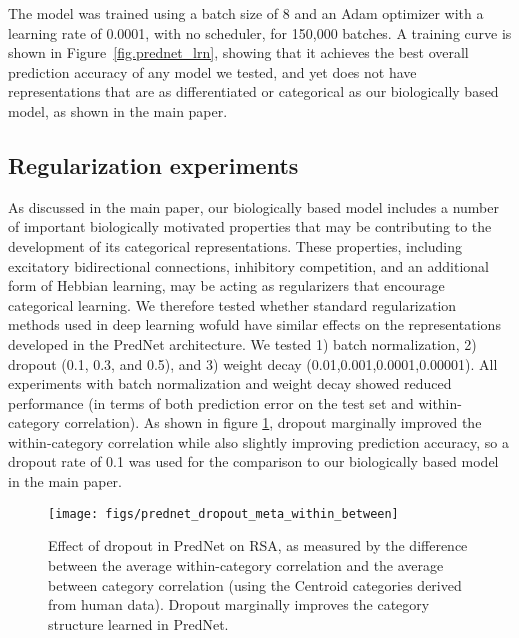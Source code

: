 \documentclass[12pt,twoside]{article}
\newif\myifpdf
\begin{document}
The model was trained using a batch size of 8 and an Adam optimizer with a learning rate of 0.0001, with no scheduler, for 150,000 batches.  A training curve is shown in Figure~\ref{fig.prednet_lrn}, showing that it achieves the best overall prediction accuracy of any model we tested, and yet does not have representations that are as differentiated or categorical as our biologically based model, as shown in the main paper.

\subsection{Regularization experiments}

As discussed in the main paper, our biologically based model includes a number of important biologically motivated properties that may be contributing to the development of its categorical representations. These properties, including excitatory bidirectional connections, inhibitory competition, and an additional form of Hebbian learning, may be acting as regularizers that encourage categorical learning. We therefore tested whether standard regularization methods used in deep learning wofuld have similar effects on the representations developed in the PredNet architecture. We tested 1) batch normalization, 2) dropout (0.1, 0.3, and 0.5), and 3) weight decay (0.01,0.001,0.0001,0.00001). All experiments with batch normalization and weight decay showed reduced performance (in terms of both prediction error on the test set and within-category correlation). As shown in figure \ref{fig.prednet_dropout_within_between}, dropout marginally improved the within-category correlation while also slightly improving prediction accuracy, so a dropout rate of 0.1 was used for the comparison to our biologically based model in the main paper. 

\begin{figure}
  \centering\texttt{[image: figs/prednet\_dropout\_meta\_within\_between]}
  \caption{Effect of dropout in PredNet on RSA, as measured by the difference between the average within-category correlation and the average between category correlation (using the Centroid categories derived from human data). Dropout marginally improves the category structure learned in PredNet.}
  \label{fig.prednet_dropout_within_between}
\end{figure}
\end{document}
